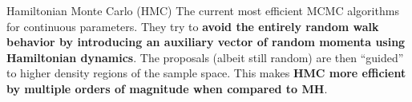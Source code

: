 \begin{frame}{Hamiltonian Monte Carlo (HMC)}
	The current most efficient MCMC algorithms for continuous parameters.
	They try to \textbf{avoid the entirely random walk behavior by introducing an auxiliary vector of random momenta
		using Hamiltonian dynamics}.
	The proposals (albeit still random) are then ``guided'' to higher density regions of the sample space.
	This makes \textbf{HMC more efficient by multiple orders of magnitude when compared to MH}.
\end{frame}




